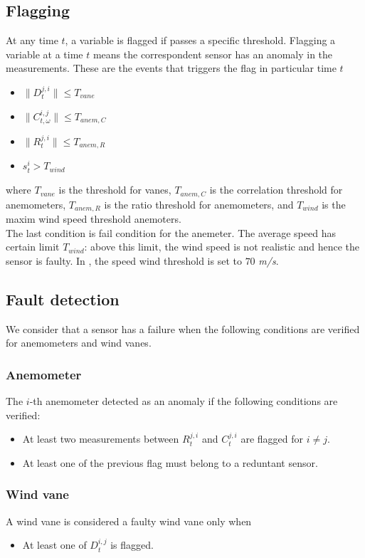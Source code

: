 \documentclass[conference]{IEEEtran}
\begin{document}
\subsection{Flagging}\label{subsec:flagging}
At any time $t$, a variable is flagged if passes a specific threshold. Flagging a variable at a time $t$ means the correspondent sensor has an anomaly in the measurements.
These are the events that triggers the flag in particular time $t$
\begin{itemize}
\item $\|D_{t}^{j,i}\| \leq T_{vane}$
\item $\|C^{i,j}_{t,\omega}\| \leq T_{anem,C}$
\item $\|R_{t}^{j,i}\| \leq T_{anem,R}$
\item $s_t^i>T_{wind}$
\end{itemize}
where $T_{vane}$ is the threshold for vanes,  $T_{anem,C}$ is the correlation threshold for anemometers,  $ T_{anem,R}$ is the ratio threshold for anemometers,  and  $T_{wind}$ is the maxim wind speed threshold anemoters.\\ 
The last condition is fail condition for the anemeter. The average speed has certain limit $T_{wind}$: above this limit, the wind speed is not realistic and hence the sensor is faulty. In \cite{}, the speed wind threshold is set to $70$ \emph{m/s}.

\subsection{Fault detection}\label{subsec:faultdetection}

We consider that a sensor has a failure when the following conditions are verified for anemometers and wind vanes.
\subsubsection{Anemometer}
The $i$-th anemometer  detected as an anomaly if the following conditions are verified:
\begin{itemize}
	\item At least two measurements between $R_{t}^{j,i}$ and $C_{t}^{j,i}$ are flagged for $i \neq j$.
	\item At least one of the previous flag must belong to a reduntant sensor.
\end{itemize}

\subsubsection{Wind vane}
A wind vane is considered a faulty wind vane  only when 
\begin{itemize}
	\item At least one of $D_t^{i,j}$ is flagged.
\end{itemize}
\end{document}
